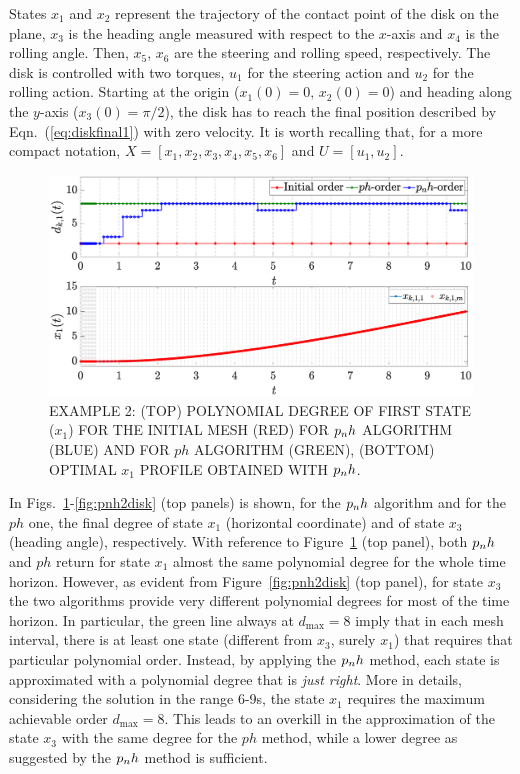 States $x_1$ and $x_2$ represent the trajectory of the contact point of the disk on the plane, $x_3$ is the heading angle measured with respect to
the $x$-axis and $x_4$ is the rolling angle. Then, $x_5$, $x_6$ are the steering and rolling speed, respectively.
The disk is controlled with two torques, $u_1$ for the steering action and $u_2$ for the rolling action. Starting at the origin ($x_1(0) = 0, \, x_2(0) = 0$) and heading along the $y$-axis ($x_3(0) = \pi/2$), the disk has to reach the final position described by
Eqn.~(\ref{eq:diskfinal1}) with zero velocity. It is worth recalling that, for a more compact notation, $X = [x_1, x_2, x_3, x_4, x_5, x_6]$  and $U = [u_1, u_2]$.
\begin{figure}[t]
	\centering
	\includegraphics[trim={1cm 0.1cm 2cm 1.05cm},clip,width=1\columnwidth]{Img/pnh1_disk1}
	\caption{EXAMPLE 2: (TOP) POLYNOMIAL DEGREE OF FIRST STATE ($x_{1}$) FOR THE INITIAL MESH (RED) FOR $p_{n}h$ ALGORITHM (BLUE) AND FOR $ph$ ALGORITHM (GREEN), (BOTTOM)
		OPTIMAL $x_1$ PROFILE OBTAINED WITH $p_{n}h$.}
	\label{fig:pnh1disk}
\end{figure}
In Figs.~\ref{fig:pnh1disk}-\ref{fig:pnh2disk} (top panels) is shown, for the $p_{n}h$ algorithm and for the $ph$ one, the final degree of state $x_1$ (horizontal coordinate) and of state $x_3$ (heading angle), respectively.
With reference to Figure~\ref{fig:pnh1disk} (top panel), both $p_{n}h$ and $ph$ return for state $x_1$ almost the same polynomial degree for the whole time horizon. However, as evident from Figure~\ref{fig:pnh2disk} (top panel), for state $x_3$ the two algorithms provide very different polynomial degrees for most of the time horizon.
In particular, the green line always at $d_{\max}=8$ imply that in each mesh interval, there is at least one state (different from $x_3$, surely $x_1$) that requires that particular polynomial order. Instead, by applying the $p_{n}h$ method, each state is approximated with a polynomial degree that is \emph{just right}.
More in details, considering the solution in the range 6-9s, the state $x_1$ requires the maximum achievable order $d_\text{max} = 8$. This leads to an overkill in the approximation of the state $x_3$ with the same degree for the $ph$ method, while a lower degree as suggested by the $p_{n}h$ method is sufficient.

